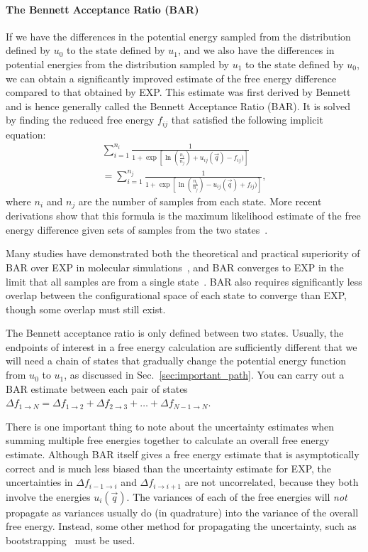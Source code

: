 \documentclass[9pt,bestpractices,pubversion]{livecoms}
\begin{document}
\paragraph{The Bennett Acceptance Ratio (BAR)}
If we have the differences in the potential energy sampled from the distribution defined by $u_0$ to the state defined by $u_1$, and we also have the differences in potential energies from the distribution sampled by $u_1$ to the state defined by $u_0$, we can obtain a significantly improved estimate of the
free energy difference compared to that obtained by EXP. 
This estimate was first derived by Bennett and is hence generally called the Bennett Acceptance Ratio (BAR). It is solved by finding the reduced free energy $f_{ij}$ that satisfied the following implicit equation:
\begin{eqnarray}
 \sum_{i=1}^{n_i} \frac{1}{1 + \exp[\ln(\frac{n_i}{n_j}) + u_{ij}(\vec{q}) - f_{ij})
 ]} \nonumber \\
 =\sum_{i=1}^{n_j} \frac{1}{1 + \exp[\ln(\frac{n_i}{n_j}) - u_{ij}(\vec{q}) + f_{ij})]},
\end{eqnarray}
where $n_i$ and $n_j$ are the number of samples from each state. More recent derivations show that this formula is the maximum likelihood estimate of the free energy difference given sets of samples from the two states~\cite{shirts2003equilibrium}. 

Many studies have demonstrated both the theoretical and practical superiority of BAR over EXP in molecular
simulations~\cite{shirts2005comparison,lu2003appropriate}, and BAR converges to EXP in the limit that all samples are from a single state~\cite{bennett1976efficient,bennett1976efficient,shirts2003equilibrium}. BAR also requires significantly less overlap between the configurational space of each state to converge than EXP, though some overlap must still exist.

The Bennett acceptance ratio is only defined between two states. Usually, the endpoints of interest in a free energy calculation are sufficiently different that we will need a chain of states that gradually change the potential energy function from $u_0$ to $u_1$, as discussed in Sec.~\ref{sec:important_path}. You can carry out a BAR estimate between each pair of states $\Delta f_{1 \rightarrow N} = \Delta {f_{1\rightarrow 2}} + \Delta {f_{2\rightarrow 3}} +  \ldots + \Delta f_{N-1\rightarrow N}$.

There is one important thing to note about the uncertainty estimates when summing multiple free energies together to calculate an overall free energy estimate. Although BAR itself gives a free energy estimate that is asymptotically correct and is much less biased than the uncertainty estimate for EXP, the uncertainties in $\Delta {f_{i-1\rightarrow i}}$ and $\Delta {f_{i\rightarrow i+1}}$ are not uncorrelated, because they both involve the energies $u_i(\vec{q})$. The variances of each of the free energies will \textit{not} propagate as variances usually do (in quadrature) into the variance of the overall free energy. Instead, some other method for propagating the uncertainty, such as bootstrapping~\cite{grossfield2018best} must be used.
\end{document}
